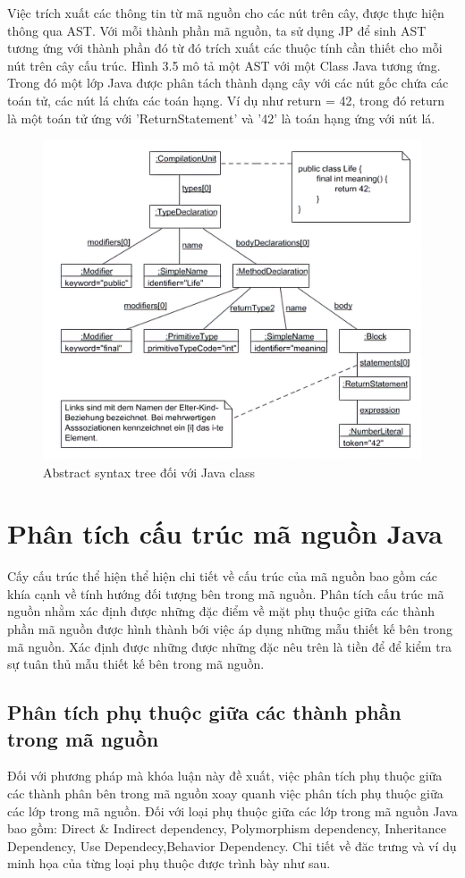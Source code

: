 \documentclass[12pt]{report}
\begin{document}
\noindent Việc trích xuất các thông tin từ mã nguồn cho các nút trên cây, được thực hiện thông qua AST. Với mỗi thành phần mã nguồn, ta sử dụng JP để sinh AST tương ứng với thành phần đó từ đó trích xuất các thuộc tính cần thiết cho mỗi nút trên cây cấu trúc.
Hình 3.5 mô tả một AST với một Class Java tương ứng. Trong đó một lớp Java được phân tách thành dạng cây với các nút gốc chứa các toán tử, các nút lá chứa các toán hạng. Ví dụ như return = 42, trong đó return là một toán tử ứng với 'ReturnStatement' và '42' là toán hạng ứng với nút lá.
\begin{figure}[!htbp]
	\centering
	\includegraphics[scale=1]{images/ast_class_java-boring}
	\caption{Abstract syntax tree đối với Java class}
	\label{fig:ast_for_java_class}
\end{figure}
\newpage
\section{Phân tích cấu trúc mã nguồn Java}
\indent Cấy cấu trúc thể hiện thể hiện chi tiết về cấu trúc của mã nguồn bao gồm các khía cạnh về tính hướng đối tượng bên trong mã nguồn. Phân tích cấu trúc mã nguồn nhằm xác định được những đặc điểm về mặt phụ thuộc giữa các thành phần mã nguồn được hình thành bới việc áp dụng những mẫu thiết kế bên trong mã nguồn. Xác định được những được những đặc nêu trên là tiền để để kiểm tra sự tuân thủ mẫu thiết kế bên trong mã nguồn.
\subsection{Phân tích phụ thuộc giữa các thành phần trong mã nguồn}
Đối với phương pháp mà khóa luận này đề xuất, việc phân tích phụ thuộc giữa các thành phân bên trong mã nguồn xoay quanh việc phân tích phụ thuộc giữa các lớp trong mã nguồn. Đối với loại phụ thuộc giữa các lớp trong mã nguồn Java bao gồm: Direct \& Indirect dependency, Polymorphism dependency, Inheritance Dependency, Use Dependecy,Behavior Dependency. Chi tiết về đăc trưng và ví dụ minh họa của từng loại phụ thuộc được trình bày như sau.
\end{document}
